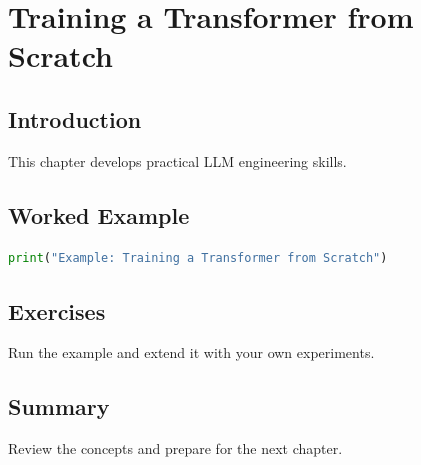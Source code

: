 \chapter{Training a Transformer from Scratch}
\label{chap:vol9-6}



\section{Introduction}
This chapter develops practical LLM engineering skills.

\section{Worked Example}
\begin{lstlisting}[language=Python]
print("Example: Training a Transformer from Scratch")
\end{lstlisting}

\section{Exercises}
\begin{exercise}
Run the example and extend it with your own experiments.
\end{exercise}

\section{Summary}
Review the concepts and prepare for the next chapter.
